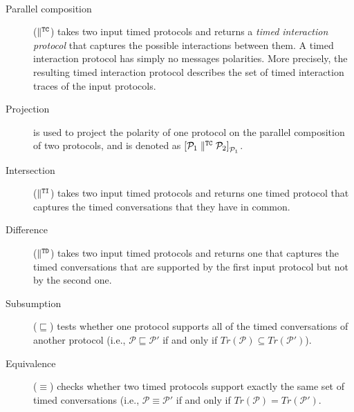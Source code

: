 \begin{definition}
~
\begin{description}

  \item[Parallel composition] ($\parallel^{\mathtt{TC}}$) takes two input timed protocols and returns a \emph{timed interaction protocol} that captures the possible interactions between them. A timed interaction protocol has simply no messages polarities. More precisely, the resulting timed interaction protocol describes the set of timed interaction traces of the input protocols.

  \item[Projection] is used to project the polarity of one protocol on the parallel composition of two protocols, and is denoted as $\left[ \mathcal{P}_1 \parallel^{\mathtt{TC}} \mathcal{P}_2 \right]_{\mathcal{P}_1}$.

  \item[Intersection] ($\parallel^{\mathtt{TI}}$) takes two input timed protocols and returns one timed protocol that captures the timed conversations that they have in common.

  \item[Difference] ($\parallel^{\mathtt{TD}}$) takes two input timed protocols and returns one that captures the timed conversations that are supported by the first input protocol but not by the second one.
  
  \item[Subsumption] ($\sqsubseteq$) tests whether one protocol supports all of the timed conversations of another protocol (i.e., $\mathcal{P} \sqsubseteq \mathcal{P'}$ if and only if $Tr(\mathcal{P}) \subseteq Tr(\mathcal{P'})$).
  
  \item[Equivalence] ($\equiv$) checks whether two timed protocols support exactly the same set of timed conversations (i.e., $\mathcal{P} \equiv \mathcal{P'}$ if and only if $Tr(\mathcal{P}) = Tr(\mathcal{P'})$. 

\end{description}
\end{definition}

